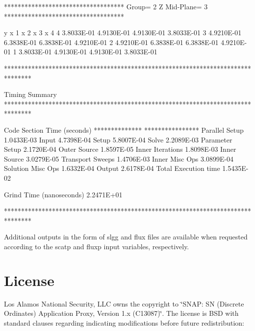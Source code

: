 \begin{DoxyVerb}
 ***********************************
  Group=   2   Z Mid-Plane=    3
 ***********************************

     y    x    1      x    2      x    3      x    4
     4  3.8033E-01  4.9130E-01  4.9130E-01  3.8033E-01
     3  4.9210E-01  6.3838E-01  6.3838E-01  4.9210E-01
     2  4.9210E-01  6.3838E-01  6.3838E-01  4.9210E-01
     1  3.8033E-01  4.9130E-01  4.9130E-01  3.8033E-01

********************************************************************************

          Timing Summary
********************************************************************************

  Code Section                          Time (seconds)
 **************                        ****************
    Parallel Setup                       1.0433E-03
    Input                                4.7398E-04
    Setup                                5.8007E-04
    Solve                                2.2089E-03
       Parameter Setup                   2.1720E-04
       Outer Source                      1.8597E-05
       Inner Iterations                  1.8098E-03
          Inner Source                   3.0279E-05
          Transport Sweeps               1.4706E-03
          Inner Misc Ops                 3.0899E-04
       Solution Misc Ops                 1.6332E-04
    Output                               2.6178E-04
  Total Execution time                   1.5435E-02

  Grind Time (nanoseconds)         2.2471E+01

********************************************************************************
\end{DoxyVerb}


Additional outputs in the form of {\ttfamily slgg} and {\ttfamily flux} files are available when requested according to the {\ttfamily scatp} and {\ttfamily fluxp} input variables, respectively.

\section*{License}

Los Alamos National Security, L\-L\-C owns the copyright to \char`\"{}\-S\-N\-A\-P\-: S\-N (\-Discrete Ordinates) Application Proxy, Version 1.\-x (\-C13087)\char`\"{}. The license is B\-S\-D with standard clauses regarding indicating modifications before future redistribution\-:

